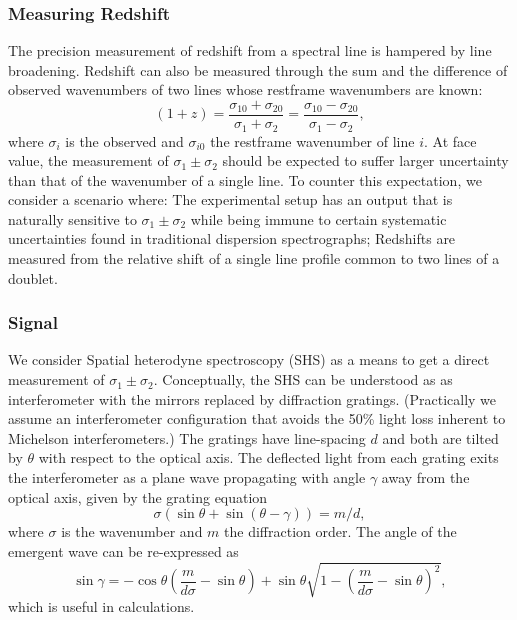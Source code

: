 \documentclass[preprint]{aastex}
\begin{document}
\subsubsection{Measuring Redshift}
The precision measurement of redshift from a spectral line is hampered by line broadening. 
Redshift can also be measured through the sum and the difference of observed wavenumbers of two lines whose restframe wavenumbers are known:
\begin{equation}
(1+z)=\frac{\sigma_{10}+\sigma_{20}}{\sigma_{1}+\sigma_{2}}=\frac{\sigma_{10}-\sigma_{20}}{\sigma_{1}-\sigma_{2}},
\label{redshift:eqn}
\end{equation}
where $\sigma_i$ is the observed and $\sigma_{i0}$ the restframe wavenumber of line $i$.
At face value, the measurement of $\sigma_1\pm\sigma_2$ should be expected to suffer larger uncertainty than that of the wavenumber
of a single line.  To counter this expectation, we consider a scenario where: The experimental setup has an output that is naturally sensitive
to $\sigma_1\pm\sigma_2$ while being immune to certain systematic uncertainties found in traditional dispersion spectrographs;
Redshifts are measured from the relative shift of a single line profile common to two lines of a doublet.


\subsubsection{Signal}

We consider Spatial heterodyne spectroscopy (SHS) \citep{1990SPIE.1235..622H}
as a means to get a direct measurement of  $\sigma_1\pm\sigma_2$.
Conceptually, the SHS can be understood as as interferometer with the  mirrors replaced by diffraction gratings.
(Practically we assume an interferometer configuration that  avoids the 50\% light loss inherent to  Michelson interferometers.)
The gratings have line-spacing $d$ and both are tilted
by $\theta$ with respect to the optical axis.  The deflected light from each grating exits the interferometer as a plane wave
propagating with angle $\gamma$ away from the optical axis,  given by the grating equation
\begin{equation}
\sigma\left(\sin{\theta}+\sin{\left(\theta-\gamma\right)}\right)=m/d,
\end{equation}
where $\sigma$ is the wavenumber and $m$ the diffraction order.
The angle of the emergent wave can be re-expressed as
\begin{equation}
\sin{\gamma}=-\cos{\theta} \left(\frac{m}{d\sigma} - \sin{\theta} \right)+ \sin{\theta}\sqrt{1-\left(\frac{m}{d\sigma} -\sin{\theta} \right)^2},
\end{equation}
which is useful in calculations.
\end{document}
